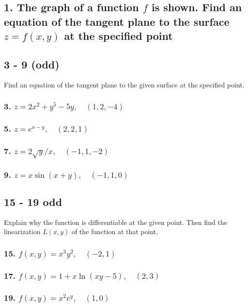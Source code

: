 \documentclass{article}
\begin{document}
\subsection*{1. The graph of a function $f$ is shown. Find an equation of the tangent plane to the surface $z = f(x,y)$ at the specified point}
\subsection*{3 - 9 (odd)}
Find an equation of the tangent plane to the given surface at the specified point.
\subsubsection*{3. $z = 2x^2 + y^5 - 5y, \quad (1, 2, -4)$}
\subsubsection*{5. $z = e^{x-y},\quad (2,2,1)$}
\subsubsection*{7. $z = 2\sqrt y / x,\quad (-1,1,-2)$}
\subsubsection*{9. $z = x\sin (x+y),\quad (-1, 1, 0)$}
\subsection*{15 - 19 odd}
Explain why the function is differentiable at the given point. Then find the linearization $L(x,y)$ of the function at that point.
\subsubsection*{15. $f(x,y) = x^3y^2,\quad (-2,1)$}
\subsubsection*{17. $f(x,y) = 1 + x\ln (xy-5),\quad (2,3)$}
\subsubsection*{19. $f(x,y) = x^2e^y,\quad (1,0)$}
\end{document}
